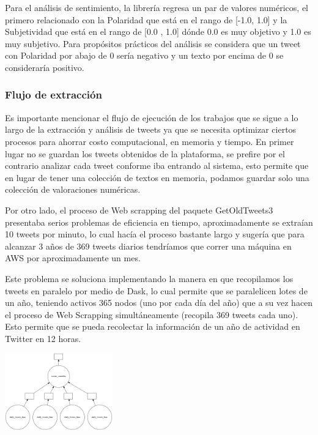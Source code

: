\documentclass[12pt,reqno,letter]{article}
\newenvironment{fig2}[1][\unskip]{}{} %
\begin{document}
\begin{multicols}{2}
    Para el análisis de sentimiento, la librería regresa un par de valores numéricos, el primero relacionado con la Polaridad que está en el rango de [-1.0, 1.0] y la Subjetividad que está en el rango de [0.0 , 1.0] dónde 0.0 es muy objetivo y 1.0 es muy subjetivo. Para propósitos prácticos del análisis se considera que un tweet con Polaridad por abajo de 0 sería negativo y un texto por encima de 0 se consideraría positivo. 
    
\subsubsection{Flujo de extracción}

    Es importante mencionar el flujo de ejecución de los trabajos que se sigue a lo largo de la extracción y análisis de tweets ya que se necesita optimizar ciertos procesos para ahorrar costo computacional, en memoria y tiempo. En primer lugar no se guardan los tweets obtenidos de la plataforma, se prefire por el contrario analizar cada tweet conforme iba entrando al sistema, esto permite que en lugar de tener una colección de textos en memoria, podamos guardar solo una colección de valoraciones numéricas.
    
    Por otro lado, el proceso de Web scrapping del paquete GetOldTweets3 presentaba serios problemas de eficiencia en tiempo, aproximadamente se extraían 10 tweets por minuto, lo cual hacía el proceso bastante largo y sugería que para alcanzar 3 años de 369 tweets diarios tendríamos que correr una máquina en AWS por aproximadamente un mes. 
    
    Este problema se soluciona implementando la manera en que recopilamos los tweets en paralelo por medio de Dask, lo cual permite que se paralelicen lotes de un año, teniendo activos 365 nodos (uno por cada día del año) que a su vez hacen el proceso de Web Scrapping simultáneamente (recopila 369 tweets cada uno). Esto permite que se pueda recolectar la información de un año de actividad en Twitter en 12 horas.
    
    \begin{fig2}\includegraphics[width=0.35\textwidth]{img/dask_vis.png}
    

\end{fig2}
\end{multicols}
\end{document}
